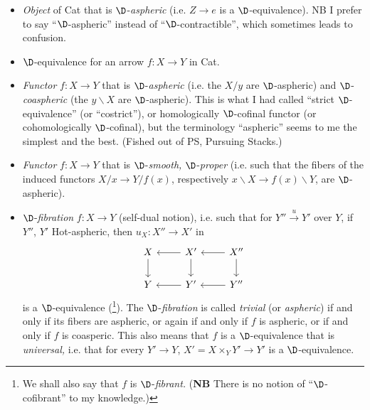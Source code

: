\begin{itemize}
\item[(i)] \textit{Object} of Cat that is $\D$-\textit{aspheric} (i.e. $Z \longrightarrow e$ is a $\D$-equivalence). NB I prefer to say ``$\D$-aspheric'' instead of ``$\D$-contractible'', which sometimes leads to confusion.

\item[\textcircled{ii}] $\D$-equivalence for an arrow $f : X \longrightarrow Y$ in Cat.

\item[(iii)] \textit{Functor} $f : X \longrightarrow Y$ that is $\D$-\textit{aspheric} (i.e. the $X/y$ are $\D$-aspheric) and $\D$-\textit{coaspheric} (the $y\backslash X$ are $\D$-aspheric). This is what I had called ``strict $\D$-equivalence'' (or ``costrict''), or homologically $\D$-cofinal functor (or cohomologically $\D$-cofinal), but the terminology ``aspheric'' seems to me the simplest and the best. (Fished out of PS, Pursuing Stacks.)

\item[(iv)] \textit{Functor} $f : X \longrightarrow Y$ that is $\D$-\textit{smooth,} $\D$-\textit{proper} (i.e. such that the fibers of the induced functors $X/x \longrightarrow Y/f(x)$, respectively $x\backslash X \longrightarrow f(x)\backslash Y$, are $\D$-aspheric).

\item[(v)] $\D$-\textit{fibration} $f : X \longrightarrow Y$ (self-dual notion), i.e. such that for $Y'' \xrightarrow{u} Y'$ over $Y$, if $Y''$, $Y'$ Hot-aspheric, then $u_X : X'' \longrightarrow X'$ in
\[
\begin{tikzcd}
X \arrow[d] & X' \arrow[l] \arrow[d] & X'' \arrow[l] \arrow[d] \\
Y & Y' \arrow[l] & Y'' \arrow[l]
\end{tikzcd}
\]
is a $\D$-equivalence (\footnote{We shall also say that $f$ is $\D$-\textit{fibrant.} (\textbf{NB} There is no notion of ``$\D$-cofibrant'' to my knowledge.)}). The $\D$-\textit{fibration} is called \textit{trivial} (or \textit{aspheric}) if and only if its fibers are aspheric, or again if and only if $f$ is aspheric, or if and only if $f$ is coasperic. This also means that $f$ is a $\D$-equivalence that is \textit{universal,} %
i.e. that for every $Y' \longrightarrow Y$, $X' = X \times_Y Y' \longrightarrow Y'$ is a $\D$-equivalence.


\end{itemize}
